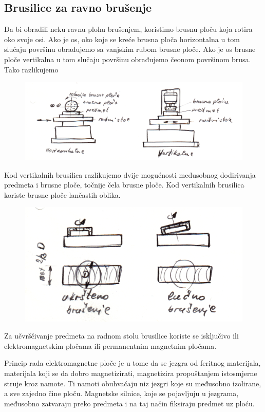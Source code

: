 \documentclass[a4paper,12pt]{article}
\numberwithin{figure}{section}
\begin{document}
\subsection{Brusilice za ravno brušenje}
Da bi obradili neku ravnu plohu brušenjem, koristimo brusnu ploču koja rotira oko svoje osi. Ako je os, oko koje se kreće brusna ploča horizontalna u tom slučaju površinu obrađujemo sa vanjskim rubom brusne ploče. Ako je os brusne ploče vertikalna u tom slučaju površinu obrađujemo čeonom površinom brusa. Tako razlikujemo
\begin{figure}[!h]
\centering
\includegraphics[scale=0.15]{image_28-1.png}
\end{figure}
\FloatBarrier
Kod vertikalnih brusilica razlikujemo dvije mogućnosti međusobnog dodirivanja predmeta i brusne ploče, točnije čela brusne ploče. Kod vertikalnih brusilica koriste brusne ploče lančastih oblika.
\begin{figure}[!h]
\centering
\includegraphics[scale=0.15]{image_28-2.png}
\end{figure}
\FloatBarrier
Za učvrščivanje predmeta na radnom stolu brusilice koriste se isključivo ili elektromagnetskim pločama ili permanentnim magnetnim pločama.\par
Princip rada elektromagnetne ploče je u tome da se jezgra od feritnog materijala, materijala koji se da dobro magnetizirati, magnetizira propuštanjem istosmjerne struje kroz namote. Ti namoti obuhvaćaju niz jezgri koje su međusobno izolirane, a sve zajedno čine ploču. Magnetske silnice, koje se pojavljuju u jezgrama, međusobno zatvaraju preko predmeta i na taj način fiksiraju predmet uz ploću.\par
\end{document}

